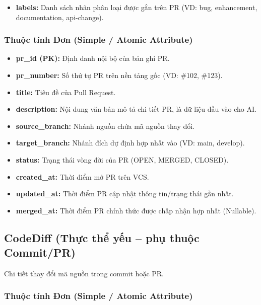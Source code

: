\begin{itemize}
    \item \textbf{labels:} Danh sách nhãn phân loại được gắn trên PR
    (VD: bug, enhancement, documentation, api-change).
\end{itemize}

\subsubsection{Thuộc tính Đơn (Simple / Atomic Attribute)}

\begin{itemize}
    \item \textbf{pr\_id (PK):} Định danh nội bộ của bản ghi PR.
    \item \textbf{pr\_number:} Số thứ tự PR trên nền tảng gốc (VD: \#102, \#123).
    \item \textbf{title:} Tiêu đề của Pull Request.
    \item \textbf{description:} Nội dung văn bản mô tả chi tiết PR, là dữ liệu đầu vào cho AI.
    \item \textbf{source\_branch:} Nhánh nguồn chứa mã nguồn thay đổi.
    \item \textbf{target\_branch:} Nhánh đích dự định hợp nhất vào (VD: main, develop).
    \item \textbf{status:} Trạng thái vòng đời của PR (OPEN, MERGED, CLOSED).
    \item \textbf{created\_at:} Thời điểm mở PR trên VCS.
    \item \textbf{updated\_at:} Thời điểm PR cập nhật thông tin/trạng thái gần nhất.
    \item \textbf{merged\_at:} Thời điểm PR chính thức được chấp nhận hợp nhất (Nullable).
\end{itemize}


\subsection{CodeDiff (Thực thể yếu -- phụ thuộc Commit/PR)}

Chi tiết thay đổi mã nguồn trong commit hoặc PR.

\subsubsection{Thuộc tính Đơn (Simple / Atomic Attribute)}

